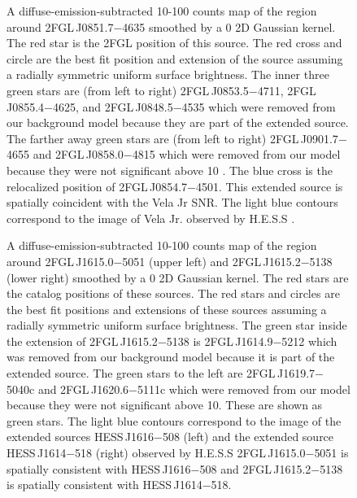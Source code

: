 \documentclass[12pt,preprint]{aastex}
\newif\ifcolorfigure
\newcommand{\gev}{\text{GeV}\xspace}
\newcommand{\tev}{\text{TeV}\xspace}
\begin{document}
\begin{figure}
    \ifcolorfigure
      \plotone{source_plots/source_Vela_Jr_color.eps}
    \else
    \fi
  \caption{A diffuse-emission-subtracted 10-100
  \gev counts map of the region around 2FGL\,J0851.7$-$4635 smoothed
  by a 0 2D Gaussian kernel. The red star is the 2FGL position of this source.  The red cross
  and circle are the best fit position and extension of the source
  assuming a radially
  symmetric uniform surface brightness.  The inner three green stars
  are (from left to right) 2FGL\,J0853.5$-$4711, 2FGL\,J0855.4$-$4625,
  and 2FGL\,J0848.5$-$4535 which were removed from our background model
  because they are part of
  the extended source.  The farther away green stars are (from left to
  right) 2FGL\,J0901.7$-$4655 and 2FGL\,J0858.0$-$4815 which were removed
  from our model
  because they were not significant above 10 \gev.  The blue cross
  is the relocalized position of 2FGL\,J0854.7$-$4501.  This extended
  source is spatially coincident with the Vela Jr SNR.  The light
  blue contours correspond to the \tev image of Vela Jr. observed by H.E.S.S
  \citep{vela_jr_hess}.
  }\label{Vela_Jr}
\end{figure}

\begin{figure}
    \ifcolorfigure
      \plotone{source_plots/source_HESS_J1614-518_color.eps}
    \else
    \fi
  \caption{
    A diffuse-emission-subtracted 10-100
    \gev counts map of the region around 2FGL\,J1615.0$-$5051 (upper
    left) and 2FGL\,J1615.2$-$5138 (lower right) smoothed by a 0
    2D Gaussian kernel.  The red stars are the catalog positions of these
    sources.  The red stars and circles are the best fit positions and
    extensions of these sources 
    assuming a radially
    symmetric uniform surface brightness.
    The green star inside the extension of 2FGL\,J1615.2$-$5138  is
    2FGL\,J1614.9$-$5212 which was removed from our background model
  because it is part of the
    extended source.  The green stars to the left are 2FGL\,J1619.7$-$5040c
    and 2FGL\,J1620.6$-$5111c which were removed from our model because they were
    not significant above 10\gev. These are shown as green stars.
    The light blue
    contours correspond to the \tev image 
    of the extended sources
    HESS\,J1616$-$508 (left) and the extended source HESS\,J1614$-$518
    (right)
    observed by H.E.S.S
    \citep{hess_plane_survey}
    2FGL\,J1615.0$-$5051 is spatially consistent with HESS\,J1616$-$508 and
    2FGL\,J1615.2$-$5138 is spatially consistent with HESS\,J1614$-$518.
  }\label{1FGL_J1613.6-5100c}
\end{figure}
\end{document}
